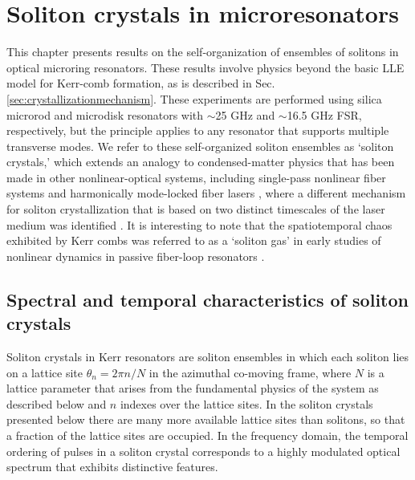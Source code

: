  \chapter{Soliton crystals in microresonators} \label{chap:SolitonCrystals}

This chapter presents results on the self-organization of ensembles of solitons in optical microring resonators. These results involve physics beyond the basic LLE model for Kerr-comb formation, as is described in Sec. \ref{sec:crystallizationmechanism}. These experiments are performed using silica microrod \cite{DelHaye2013} and microdisk \cite{Lee2012} resonators with $\sim$25 GHz and $\sim$16.5 GHz FSR, respectively, but the principle applies to any resonator that supports multiple transverse modes. We refer to these self-organized soliton ensembles as `soliton crystals,' which extends an analogy to condensed-matter physics that has been made in other nonlinear-optical systems, including single-pass nonlinear fiber systems \cite{Zajnulina2017} and harmonically mode-locked fiber lasers \cite{Haboucha2008,Amrani2011a}, where a different mechanism for soliton crystallization that is based on two distinct timescales of the laser medium was identified \cite{Haboucha2008c}. It is interesting to note that the spatiotemporal chaos exhibited by Kerr combs was referred to as a `soliton gas' in early studies of nonlinear dynamics in passive fiber-loop resonators \cite{Malomed1998,Mitschke1998,Schwache1997}. 

\section{Spectral and temporal characteristics of soliton crystals}

Soliton crystals in Kerr resonators are soliton ensembles in which each soliton lies on a lattice site $\theta_n= 2\pi n/N$ in the azimuthal co-moving frame, where $N$ is a lattice parameter that arises from the fundamental physics of the system as described below and $n$ indexes over the lattice sites. In the soliton crystals presented below there are many more available lattice sites than solitons, so that a fraction of the lattice sites are occupied. In the frequency domain, the temporal ordering of pulses in a soliton crystal corresponds to a highly modulated optical spectrum that exhibits distinctive features. 


